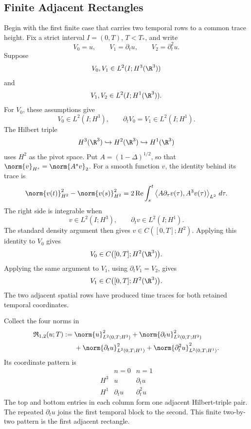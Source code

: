 
\subsection{Finite Adjacent Rectangles}\label{sub:FiniteAdjacentRectangles}

Begin with the first finite case that carries two temporal rows to a common trace height.
Fix a strict interval \(I=(0,T)\), \(T<T_*\), and write
\[
  V_0=u,
  \qquad
  V_1=\partial_tu,
  \qquad
  V_2=\partial_t^2u.
\]
Suppose
\[
  V_0,V_1
  \in
  L^2(I;H^3(\R^3))
\]
and
\[
  V_1,V_2
  \in
  L^2(I;H^1(\R^3)).
\]
For \(V_0\), these assumptions give
\[
  V_0\in L^2(I;H^3),
  \qquad
  \partial_tV_0=V_1\in L^2(I;H^1).
\]
The Hilbert triple
\[
  H^3(\R^3)
  \hookrightarrow
  H^2(\R^3)
  \hookrightarrow
  H^1(\R^3)
\]
uses \(H^2\) as the pivot space.
Put \(A=(1-\Delta)^{1/2}\), so that \(\norm{v}_{H^s}=\norm{A^sv}_2\).
For a smooth function \(v\), the identity behind its trace is
\[
  \norm{v(t)}_{H^2}^2
  -
  \norm{v(s)}_{H^2}^2
  =
  2\operatorname{Re}\int_s^t
  \left\langle
    A\partial_\tau v(\tau),
    A^3v(\tau)
  \right\rangle_{L^2}
  \,d\tau.
\]
The right side is integrable when
\[
  v\in L^2(I;H^3),
  \qquad
  \partial_tv\in L^2(I;H^1).
\]
The standard density argument then gives \(v\in C([0,T];H^2)\).
Applying this identity to \(V_0\) gives
\[
  V_0\in C\bigl([0,T];H^2(\R^3)\bigr).
\]
Applying the same argument to \(V_1\), using \(\partial_tV_1=V_2\), gives
\[
  V_1\in C\bigl([0,T];H^2(\R^3)\bigr).
\]
The two adjacent spatial rows have produced time traces for both retained temporal coordinates.

Collect the four norms in
\begin{align*}
  \mathfrak R_{1,2}(u;T)
  :={}&
  \norm{u}_{L^2(0,T;H^3)}^2
  +
  \norm{\partial_tu}_{L^2(0,T;H^3)}^2
  \\
  &+
  \norm{\partial_tu}_{L^2(0,T;H^1)}^2
  +
  \norm{\partial_t^2u}_{L^2(0,T;H^1)}^2.
\end{align*}
Its coordinate pattern is
\[
  \begin{array}{c|cc}
    & n=0 & n=1
    \\
    \hline
    H^3
    & u & \partial_tu
    \\
    H^1
    & \partial_tu & \partial_t^2u
  \end{array}
\]
The top and bottom entries in each column form one adjacent Hilbert-triple pair.
The repeated \(\partial_tu\) joins the first temporal block to the second.
This finite two-by-two pattern is the first adjacent rectangle.

